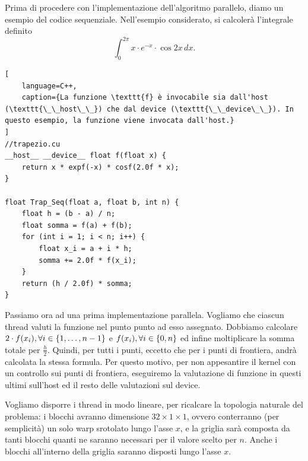 Prima di procedere con l'implementazione dell'algoritmo parallelo, diamo un esempio del codice sequenziale.
Nell'esempio considerato, si calcolerà l'integrale definito
\[\int_{0}^{2\pi}x\cdot e^{-x} \cdot \cos 2x \,dx.\]

\begin{lstlisting}[
    language=C++, 
    caption={La funzione \texttt{f} è invocabile sia dall'host (\texttt{\_\_host\_\_}) che dal device (\texttt{\_\_device\_\_}). In questo esempio, la funzione viene invocata dall'host.}
]
//trapezio.cu
__host__ __device__ float f(float x) {
    return x * expf(-x) * cosf(2.0f * x);
}

float Trap_Seq(float a, float b, int n) {
    float h = (b - a) / n;
    float somma = f(a) + f(b);
    for (int i = 1; i < n; i++) {
        float x_i = a + i * h;
        somma += 2.0f * f(x_i);
    }
    return (h / 2.0f) * somma;
}
\end{lstlisting}

Passiamo ora ad una prima implementazione parallela. Vogliamo che ciascun thread valuti la funzione nel punto punto ad esso assegnato.
Dobbiamo calcolare \(2\cdot f(x_i), \forall i \in \set{1,\ldots,n-1}\) e \(f(x_i), \forall i \in \set{0, n}\) ed infine moltiplicare la somma totale per \(\frac{h}{2}\). 
Quindi, per tutti i punti, eccetto che per i punti di frontiera, andrà calcolata la stessa formula.
Per questo motivo, per non appesantire il kernel con un controllo sui punti di frontiera, eseguiremo la valutazione di funzione in questi ultimi sull'host ed il resto delle valutazioni sul device.

Vogliamo disporre i thread in modo lineare, per ricalcare la topologia naturale del problema: i blocchi avranno dimensione \(32\times 1 \times 1\), ovvero conterranno (per semplicità) un solo warp srotolato lungo l'asse \(x\), e la griglia sarà composta da tanti blocchi quanti ne saranno necessari per il valore scelto per \(n\). Anche i blocchi all'interno della griglia saranno disposti lungo l'asse \(x\).

